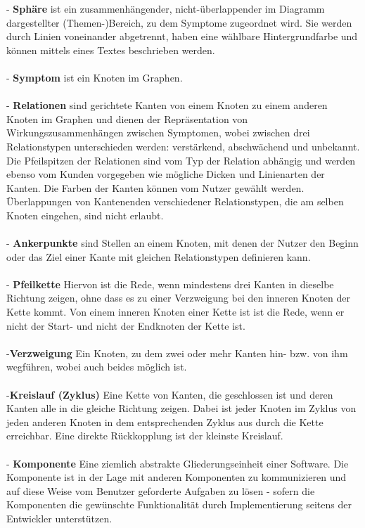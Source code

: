 \documentclass[enabledeprecatedfontcommands,fontsize=11pt,paper=a4,twoside]{scrartcl}
\newcounter{one}
\begin{document}
- \textbf{\hypertarget{Sphaere}{Sphäre}} ist ein zusammenhängender, nicht-überlappender im Diagramm dargestellter (Themen-)Bereich, zu dem Symptome zugeordnet wird. Sie werden durch Linien voneinander abgetrennt, haben eine wählbare Hintergrundfarbe und können mittels eines Textes beschrieben werden. \\ \\
- \textbf{\hypertarget{Symptom}{Symptom}} ist ein Knoten im Graphen.  \\ \\
- \textbf{Relationen} sind gerichtete Kanten von einem Knoten zu einem anderen Knoten im Graphen und dienen der Repräsentation von Wirkungszusammenhängen zwischen Symptomen, wobei zwischen drei Relationstypen unterschieden werden: verstärkend, abschwächend und unbekannt. Die Pfeilspitzen der Relationen sind vom Typ der Relation abhängig und werden ebenso vom Kunden vorgegeben wie mögliche Dicken und Linienarten der Kanten. Die Farben der Kanten können vom Nutzer gewählt werden. Überlappungen von Kantenenden verschiedener Relationstypen, die am selben Knoten eingehen, sind nicht erlaubt. \\ \\
- \textbf{Ankerpunkte}  sind Stellen an einem Knoten, mit denen der Nutzer den Beginn oder das Ziel einer Kante mit gleichen Relationstypen definieren kann. \\ \\
- \textbf{Pfeilkette} Hiervon ist die Rede, wenn mindestens drei Kanten in dieselbe Richtung zeigen, ohne dass es zu einer Verzweigung bei den inneren Knoten der Kette kommt. Von einem inneren Knoten einer Kette ist ist die Rede, wenn er nicht der Start- und nicht der Endknoten der Kette ist. \\ \\
-\textbf{Verzweigung} Ein Knoten, zu dem zwei oder mehr Kanten hin- bzw. von ihm wegführen, wobei auch beides möglich ist. \\ \\
-\textbf{\hypertarget{Kreislauf}{Kreislauf (Zyklus)}} Eine Kette von Kanten, die geschlossen ist und deren Kanten alle in die gleiche Richtung zeigen. Dabei ist jeder Knoten im Zyklus von jeden anderen Knoten in dem entsprechenden Zyklus aus durch die Kette erreichbar. Eine direkte Rückkopplung ist der kleinste Kreislauf. \\ \\
- \textbf{Komponente} Eine ziemlich abstrakte Gliederungseinheit einer Software. Die Komponente ist in der Lage mit anderen Komponenten zu kommunizieren und auf diese Weise vom Benutzer geforderte Aufgaben zu lösen - sofern die Komponenten die gewünschte Funktionalität durch Implementierung seitens der Entwickler unterstützen. \\ \\
\end{document}
